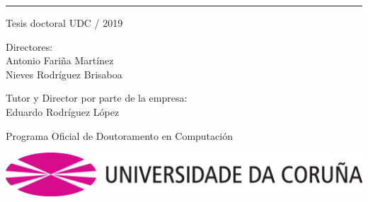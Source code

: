 \begin{titlepage}


\vspace*{0.9cm}


\vspace*{1.5cm}



\noindent \textcolor{rosaudc}{\rule{\textwidth}{2mm}}

{\large
  \noindent Tesis doctoral UDC / 2019

  \vspace*{1.5cm}

  \noindent Directores: \\Antonio Fari\~na Mart\'inez \\ Nieves Rodr\'iguez Brisaboa
  
  \vspace*{1.0cm}
  
  \noindent Tutor y Director por parte de la empresa: \\Eduardo Rodr\'iguez L\'opez
  
  \vspace*{1.5cm}

  \noindent Programa Oficial de Doutoramento en Computaci\'on
}

\begin{center}
  \vspace*{1.9cm}
  \includegraphics[scale=0.20]{figures/_init/udc-color}
\end{center}


\end{titlepage}

\thispagestyle{empty}

